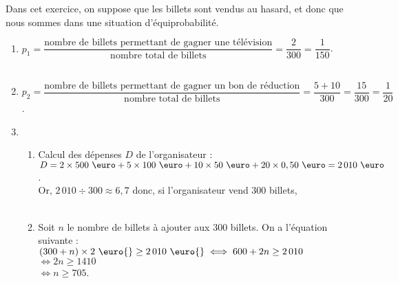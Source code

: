 Dans cet exercice, on suppose que les billets sont vendus au hasard, et donc que nous sommes dans une situation d'équiprobabilité. \\ [3mm]
\begin{enumerate}
   \item $p_1 =\dfrac{\text{nombre de billets permettant de gagner une télévision}}{\text{nombre total de billets}} =\dfrac{2}{300} =\dfrac{1}{150}$. \\ [2mm]
    \\ [2mm]
   \item $p_2 =\dfrac{\text{nombre de billets permettant de gagner un bon de réduction}}{\text{nombre total de billets}} =\dfrac{5+10}{300} =\dfrac{15}{300} =\dfrac{1}{20}$. \\ [2mm]
   \item
   \begin{enumerate}
      \item Calcul des dépenses $D$ de l'organisateur : \\
      $D =2\times500\text{ \euro}+5\times100\text{ \euro}+10\times50\text{ \euro} +20\times0,50\text{ \euro} =2\,010\text{ \euro}$. \\
      Or, $2\,010\div300 \approx6,7$ donc, si l'organisateur vend 300 billets, \\
       \\
      \item Soit $n$ le nombre de billets à ajouter aux 300 billets. On a l'équation suivante : \\
      $(300+n)\times 2\text{ \euro{}} \geq2\,010\text{ \euro{}} \iff 600+2n\geq2\,010$ \\
      \hspace*{3.7cm} $\iff 2n \geq1410$ \\
      \hspace*{3.7cm} $\iff n\geq705$. \\
   \end{enumerate}
\end{enumerate}

